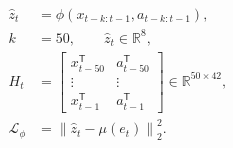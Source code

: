 \documentclass[border=7pt]{standalone}
\begin{document}
\color{ink}
$\displaystyle \begin{aligned}
\hat z_t&=\phi\!\left(x_{t-k:t-1},a_{t-k:t-1}\right),\\[3pt]
k&=50,\qquad\hat z_t\in\mathbb R^8,\\[3pt]
H_t&=\begin{bmatrix}x_{t-50}^{\mathsf T}&a_{t-50}^{\mathsf T}\\ \vdots&\vdots\\x_{t-1}^{\mathsf T}&a_{t-1}^{\mathsf T}\end{bmatrix}\in\mathbb R^{50\times42},\\[3pt]
\mathcal L_\phi&=\left\|\hat z_t-\mu(e_t)\right\|_2^2.
\end{aligned}$
\end{document}
